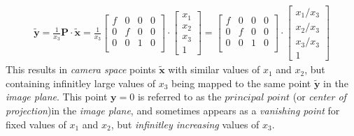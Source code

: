 \begin{equation*}
\begin{split}
\mathbf{\tilde{y}}
=
\frac{1}{x_3}\mathbf{P}\cdot\mathbf{\tilde{x}}
=
\frac{1}{x_3}\begin{bmatrix}
f & 0 & 0 & 0\\
0 & f & 0 & 0\\
0 & 0 & 1 & 0\\
\end{bmatrix}\cdot\begin{bmatrix}x_1\\x_2\\x_3\\1\end{bmatrix}
=
\begin{bmatrix}
f & 0 & 0 & 0\\
0 & f & 0 & 0\\
0 & 0 & 1 & 0\\
\end{bmatrix}\cdot\begin{bmatrix}x_1/x_3\\x_2/x_3\\x_3/x_3\\1\end{bmatrix}
\end{split}
\end{equation*}%
This results in \textit{camera space} points $\mathbf{\tilde{x}}$ with similar values of $x_1$ and $x_2$, but containing infinitley large values of $x_3$ being mapped to the same point $\mathbf{\tilde{y}}$ in the \textit{image plane}. This point $\mathbf{y}=0$ is referred to as the $\textit{principal point}$ (or \textit{center of projection})in the \textit{image plane}, and sometimes appears as a \textit{vanishing point} for fixed values of $x_1$ and $x_2$, but \textit{infinitley increasing} values of $x_3$.\newline


